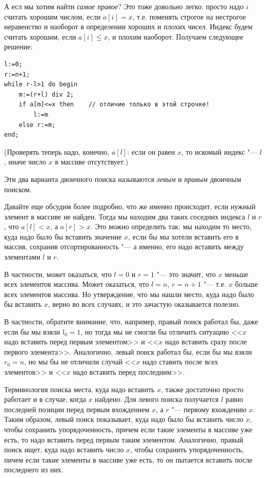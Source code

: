 \documentclass[a4paper,10pt]{problems}
\begin{document}
А есл мы хотим найти \textit{самое правое}? 
Это тоже довольно легко: просто надо $i$ считать хорошим числом, если $a[i]=x$, 
т.е. поменять строгое на нестрогое неравенство и наоборот в определении хороших и плохих чисел.
Индекс будем считать хорошим, если $a[i]\leq x$, и плохим наоборот. Получаем следующее решение:
\begin{codesampleo}\begin{verbatim}
l:=0;
r:=n+1;  
while r-l>1 do begin    
    m:=(r+l) div 2;
    if a[m]<=x then    // отличие только в этой строчке!
        l:=m
    else r:=m;
end;
\end{verbatim}
\end{codesampleo}
(Проверять теперь надо, конечно, $a[l]$: если он равен $x$, то искомый индекс "--- $l$, 
иначе число $x$ в массиве отсутствует.)

Эти два варианта двоичного поиска называются \textit{левым} и \textit{правым} двоичным поиском.

Давайте еще обсудим более подробно, что же именно происходит, если нужный элемент в массиве не найден.
Тогда мы находим два таких соседних индекса $l$ и $r$, что $a[l]<x$, а $a[r]>x$.
Это можно определить так: мы находим то место, куда надо было бы вставить значение $x$, 
если бы мы хотели вставить его в массив, сохранив отсортированность "--- а именно,
его надо вставить между элементами $l$ и $r$.

В частности, может оказаться, что $l=0$ и $r=1$ "--- это значит, что $x$ меньше всех элементов массива.
Может оказаться, что $l=n$, $r=n+1$ "--- т.е. $x$ больше всех элементов массива.
Но утверждение, что мы нашли место, куда надо было бы вставить $x$, верно во всех случаях, 
и это зачастую оказывается полезно.

В частности, обратите внимание, что, например, правый поиск работал бы, даже если бы мы взяли $l_0=1$, 
но тогда мы не смогли бы отличить ситуацию <<$x$ надо вставить перед первым элементом>> 
и <<$x$ надо вставить сразу после первого элемента>>.
Аналогично, левый поиск работал бы, если бы мы взяли $r_0=n$, но мы бы не отличили 
случай <<$x$ надо ставить после всех элементов>> и <<$x$ надо вставить перед последним>>.

Терминология поиска места, куда надо вставить $x$, также достаточно просто
работает и в случае, когда $x$ найдено.
Для левого поиска получается $l$ равно последней позиции перед первым вхождением $x$,
а $r$ "--- первому вхождению $x$. 
Таким образом, левый поиск показывает, куда надо было бы вставить число $x$,
чтобы сохранить упорядоченность, причем если такие элементы в массиве уже есть,
то надо вставить перед первым таким элементом.
Аналогично, правый поиск ищет, куда надо вставить число $x$, чтобы сохранить упорядоченность,
пичем если такие элементы в массиве уже есть, то он пытается вставить после последнего из них.
\end{document}
